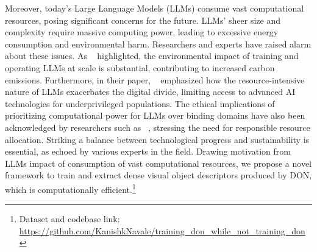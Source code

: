 Moreover, today's Large Language Models (LLMs) consume vast computational resources, posing significant concerns for the future.
LLMs' sheer size and complexity require massive computing power, leading to excessive energy consumption and environmental harm.
Researchers and experts have raised alarm about these issues. As ~\cite{bender2021dangers} highlighted, the environmental impact of training and operating LLMs at scale is substantial, contributing to increased carbon emissions.
Furthermore, in their paper, \citeauthor{strubell2019energy}~\cite{strubell2019energy} emphasized how the resource-intensive nature of LLMs exacerbates the digital divide,
limiting access to advanced AI technologies for underprivileged populations. The ethical implications of prioritizing computational power for LLMs over binding
domains have also been acknowledged by researchers such as \citeauthor{amodei2016concrete}~\cite{amodei2016concrete}, stressing the need for responsible resource allocation. Striking a balance between
technological progress and sustainability is essential, as echoed by various experts in the field. Drawing motivation from LLMs impact of consumption of vast computational resources,
we propose a novel framework to train and extract dense visual object descriptors produced by DON, which is computationally efficient.\footnote{Dataset and codebase link: \url{https://github.com/KanishkNavale/training_don_while_not_training_don}}